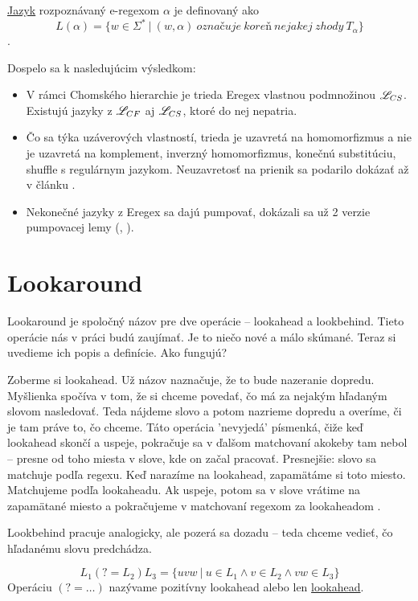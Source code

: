 \begin{df}
\underline{Jazyk} rozpoznávaný e-regexom $\alpha$ je definovaný ako
$$ L(\alpha) = \lbrace w \in \Sigma^* ~|~(w,\alpha ) ~označuje~koreň~nejakej~zhody~T_\alpha \rbrace $$.
\end{df}

Dospelo sa k nasledujúcim výsledkom:
\begin{itemize}
\item V rámci Chomského hierarchie je trieda Eregex vlastnou podmnožinou $\mathscr{L}_{CS}$. Existujú jazyky z $\mathscr{L}_{CF}$ aj $\mathscr{L}_{CS}$, ktoré do nej nepatria.
\item Čo sa týka uzáverových vlastností, trieda je uzavretá na homomorfizmus a nie je uzavretá na komplement, inverzný homomorfizmus, konečnú substitúciu, shuffle s regulárnym jazykom. Neuzavretosť na prienik sa podarilo dokázať až v článku \cite{ExtendedRegexIntersec}.
\item Nekonečné jazyky z Eregex sa dajú pumpovať, dokázali sa už 2 verzie pumpovacej lemy (\cite[Lemma 1]{ExtendedRegexPower}, \cite[Lemma 3]{ExtendedRegexIntersec}).
\end{itemize}

\section{Lookaround}
\label{dflookaround}

Lookaround je spoločný názov pre dve operácie -- lookahead a lookbehind. Tieto operácie nás v práci budú zaujímať. Je to niečo nové a málo skúmané. Teraz si uvedieme ich popis a definície. Ako fungujú? 

Zoberme si lookahead. Už názov naznačuje, že to bude nazeranie dopredu. Myšlienka spočíva v tom, že si chceme povedať, čo má za nejakým hľadaným slovom nasledovať. Teda nájdeme slovo a potom nazrieme dopredu a overíme, či je tam práve to, čo chceme. Táto operácia 'nevyjedá' písmenká, čiže keď lookahead skončí a uspeje, pokračuje sa v ďalšom matchovaní akokeby tam nebol -- presne od toho miesta v slove, kde on začal pracovať. Presnejšie: slovo sa matchuje podľa regexu. Keď narazíme na look\-ahead, zapamätáme si toto miesto. Matchujeme podľa lookaheadu. Ak uspeje, potom sa v slove vrátime na zapamätané miesto a pokračujeme v matchovaní regexom za lookaheadom \cite{Python3Documentation}.

Lookbehind pracuje analogicky, ale pozerá sa dozadu -- teda chceme vedieť, čo hľadanému slovu predchádza. 

\begin{df}
$$ L_{1}(?=L_{2})L_{3} = \lbrace uvw ~|~ u \in L_{1} \land v \in L_{2} \land vw \in L_{3} \rbrace $$ Operáciu $(?=\dots)$ nazývame pozitívny lookahead alebo len \underline{lookahead}.
\end{df}

